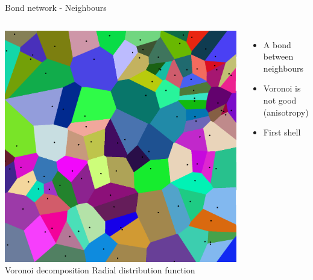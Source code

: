 \begin{frame}{Bond network - Neighbours}
	\begin{columns}
	\includegraphics[width=\columnwidth]{voro2d}\\
	\centering Voronoi decomposition
	\centering Radial distribution function\\
	{\def\svgwidth{\columnwidth}}
	\begin{itemize}
		\item A bond between neighbours
		\item Voronoi is not good (anisotropy)
		\item First shell
	\end{itemize}
	\end{columns}
\end{frame}

